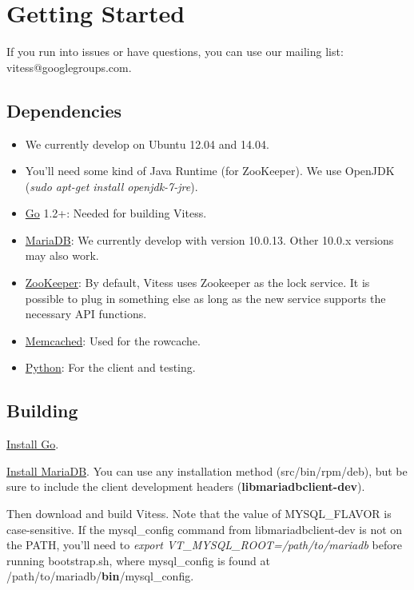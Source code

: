 \section{Getting Started}\hypertarget{getting-started}{}\label{getting-started}

If you run into issues or have questions, you can use our mailing list: vitess@googlegroups.com.

\subsection{Dependencies}\hypertarget{dependencies}{}\label{dependencies}

\begin{itemize}
\item We currently develop on Ubuntu 12.04 and 14.04.
\item You'll need some kind of Java Runtime (for ZooKeeper).
We use OpenJDK (\emph{sudo apt-get install openjdk-7-jre}).
\item \href{http://golang.org}{Go} 1.2+: Needed for building Vitess.
\item \href{https://mariadb.org/}{MariaDB}: We currently develop with version 10.0.13.
Other 10.0.x versions may also work.
\item \href{http://zookeeper.apache.org/}{ZooKeeper}: By default, Vitess
uses Zookeeper as the lock service. It is possible to plug in
something else as long as the new service supports the
necessary API functions.
\item \href{http://memcached.org}{Memcached}: Used for the rowcache.
\item \href{http://python.org}{Python}: For the client and testing.
\end{itemize}

\subsection{Building}\hypertarget{building}{}\label{building}

\href{http://golang.org/doc/install}{Install Go}.

\href{https://downloads.mariadb.org/}{Install MariaDB}.
You can use any installation method (src/bin/rpm/deb),
but be sure to include the client development headers (\textbf{libmariadbclient-dev}).

Then download and build Vitess. Note that the value of MYSQL\_FLAVOR is case-sensitive.
If the mysql\_config command from libmariadbclient-dev is not on the PATH,
you'll need to \emph{export VT\_MYSQL\_ROOT=/path/to/mariadb} before running bootstrap.sh,
where mysql\_config is found at /path/to/mariadb/\textbf{bin}/mysql\_config.

